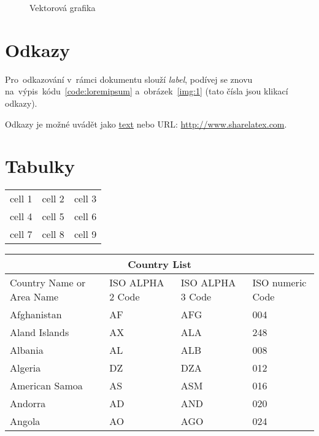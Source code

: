 \newpage

\vspace{0.5cm}
\begin{figure}[h!]
\begin{center}
\caption{Vektorová grafika}
\label{img:2}
\end{center}
\end{figure}


\section{Odkazy}

\noindent Pro~odkazování v~rámci dokumentu slouží \emph{label}, podívej se znovu na~výpis~kódu~\ref{code:loremipsum} a~obrázek~\ref{img:1} (tato čísla jsou klikací odkazy).

\noindent Odkazy je možné uvádět jako \href{http://www.sharelatex.com}{text} nebo URL: \url{http://www.sharelatex.com}.

\section{Tabulky}

\begin{center}
\begin{tabular}{ c c c }
    cell 1 & cell 2 & cell 3 \\ 
    cell 4 & cell 5 & cell 6 \\  
    cell 7 & cell 8 & cell 9 \\
\end{tabular}
\end{center}

\begin{center}
\begin{tabular}{ |p{3cm}||p{3cm}|p{3cm}|p{3cm}|  }
\hline
    \multicolumn{4}{|c|}{Country List} \\
\hline
    Country Name or Area Name & ISO ALPHA 2 Code & ISO ALPHA 3 Code & ISO numeric Code \\
\hline
    Afghanistan    & AF & AFG & 004 \\
    Aland Islands  & AX & ALA & 248 \\
    Albania        & AL & ALB & 008 \\
    Algeria        & DZ & DZA & 012 \\
    American Samoa & AS & ASM & 016 \\
    Andorra        & AD & AND & 020 \\
    Angola         & AO & AGO & 024 \\
\hline
\end{tabular}
\end{center}
